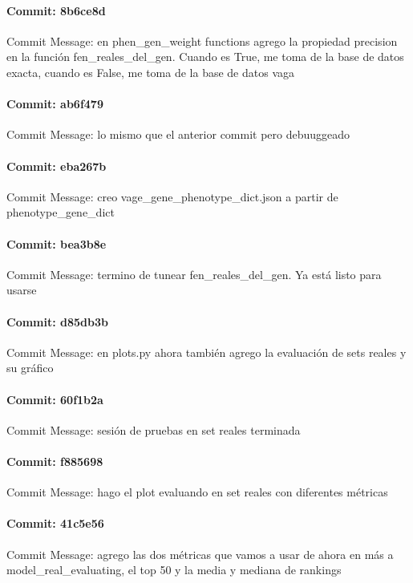 \documentclass{article}
\begin{document}
\paragraph{Commit: 8b6ce8d}
Commit Message: en phen_gen_weight functions agrego la propiedad precision en la función fen_reales_del_gen. Cuando es True, me toma de la base de datos exacta, cuando es False, me toma de la base de datos vaga

\paragraph{Commit: ab6f479}
Commit Message: lo mismo que el anterior commit pero debuuggeado

\paragraph{Commit: eba267b}
Commit Message: creo vage_gene_phenotype_dict.json a partir de phenotype_gene_dict

\paragraph{Commit: bea3b8e}
Commit Message: termino de tunear fen_reales_del_gen. Ya está listo para usarse

\paragraph{Commit: d85db3b}
Commit Message: en plots.py ahora también agrego la evaluación de sets reales y su gráfico

\paragraph{Commit: 60f1b2a}
Commit Message: sesión de pruebas en set reales terminada

\paragraph{Commit: f885698}
Commit Message: hago el plot evaluando en set reales con diferentes métricas

\paragraph{Commit: 41c5e56}
Commit Message: agrego las dos métricas que vamos a usar de ahora en más a model_real_evaluating, el top 50 y la media y mediana de rankings
\end{document}
